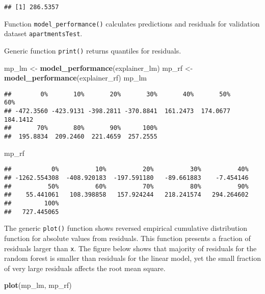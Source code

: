 \documentclass[]{book}
\newenvironment{Shaded}{\begin{snugshade}}{\end{snugshade}}
\newcommand{\KeywordTok}[1]{\textcolor[rgb]{0.13,0.29,0.53}{\textbf{#1}}}
\newcommand{\NormalTok}[1]{#1}
\newcommand{\StringTok}[1]{\textcolor[rgb]{0.31,0.60,0.02}{#1}}
\theoremstyle{definition}
\theoremstyle{definition}
\theoremstyle{definition}
\theoremstyle{remark}
\begin{document}
\begin{verbatim}
## [1] 286.5357
\end{verbatim}

Function \texttt{model\_performance()} calculates predictions and
residuals for validation dataset \texttt{apartmentsTest}.

Generic function \texttt{print()} returns quantiles for residuals.

\begin{Shaded}
\begin{Highlighting}[]
\NormalTok{mp_lm <-}\StringTok{ }\KeywordTok{model_performance}\NormalTok{(explainer_lm)}
\NormalTok{mp_rf <-}\StringTok{ }\KeywordTok{model_performance}\NormalTok{(explainer_rf)}
\NormalTok{mp_lm}
\end{Highlighting}
\end{Shaded}

\begin{verbatim}
##        0%       10%       20%       30%       40%       50%       60% 
## -472.3560 -423.9131 -398.2811 -370.8841  161.2473  174.0677  184.1412 
##       70%       80%       90%      100% 
##  195.8834  209.2460  221.4659  257.2555
\end{verbatim}

\begin{Shaded}
\begin{Highlighting}[]
\NormalTok{mp_rf}
\end{Highlighting}
\end{Shaded}

\begin{verbatim}
##           0%          10%          20%          30%          40% 
## -1262.554308  -408.920183  -197.591180   -89.661883    -7.454146 
##          50%          60%          70%          80%          90% 
##    55.441061   108.398858   157.924244   218.241574   294.264602 
##         100% 
##   727.445065
\end{verbatim}

The generic \texttt{plot()} function shows reversed empirical cumulative
distribution function for absolute values from residuals. This function
presents a fraction of residuals larger than \texttt{x}. The figure
below shows that majority of residuals for the random forest is smaller
than residuals for the linear model, yet the small fraction of very
large residuals affects the root mean square.

\begin{Shaded}
\begin{Highlighting}[]
\KeywordTok{plot}\NormalTok{(mp_lm, mp_rf)}
\end{Highlighting}
\end{Shaded}
\end{document}

